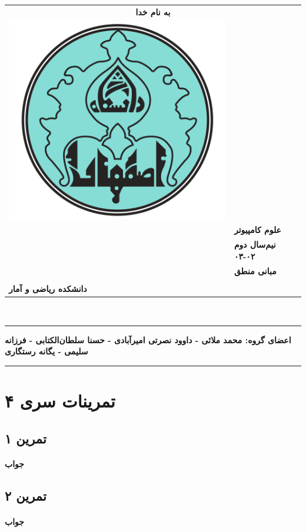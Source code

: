 \documentclass[]{exam}
\begin{document}
\pagestyle{head}
\firstpageheader{}{}{}
\runningheadrule
\begin{tabular}{p{} l}
\multicolumn{2}{c}{\textbf{به نام خدا}}\\
\multirow{2}{*}{\includegraphics[scale=0.2] {UILOGO.png}} & \\ \\
&  \textbf{علوم کامپیوتر}\\
&  \textbf{نیم‌سال دوم ۰۲-۰۳}\\
&  \textbf{مبانی منطق}\\ \\
 \textbf{دانشکده ریاضی و آمار} &  \\
\end{tabular}\\

\rule[1ex]{\textwidth}{.1pt}
\textbf{
    اعضای گروه: 
    محمد ملائی - داوود نصرتی امیرآبادی - 
    حسنا سلطان‌الکتابی - فرزانه سلیمی - یگانه رستگاری
}


\rule[1ex]{\textwidth}{.1pt}
\vspace{0pt}

\section*{تمرینات سری ۴}
\subsection*{تمرین ۱}

\paragraph*{جواب}


\subsection*{تمرین ۲}

\paragraph*{جواب}

\end{document}
